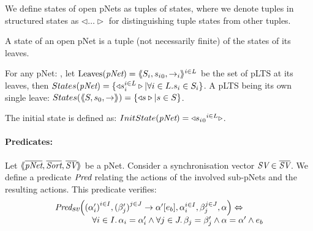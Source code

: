 \documentclass{lncs/llncs}
\begin{document}
%

We define states of open pNets as tuples of states, where we denote tuples
in structured states as $\triangleleft\ldots\triangleright$ for distinguishing tuple 
states from other tuples.
\begin{definition}\label{def-states}
  A state of an open pNet is a tuple (not necessarily finite) of the
  states of its leaves.

  For any pNet: \pNet, let $\Leaves(\pNet) = \mylangle S_i,{s_i}_0, \to_i\myrangle^{i \in L}$ be 
  the set of pLTS at its leaves,
  then $States(\pNet) = \{\triangleleft s_i^{i\in L}
  \triangleright| \forall i\in L. s_i \in S_i\}$.
A pLTS being its own single leave:
  $States(\langle\hspace{-0.58ex}\langle S,s_0, \to\rangle\hspace{-0.58ex}\rangle) = \{\triangleleft s \triangleright| s \in S\}$.

The initial state is defined as:
$InitState(\pNet) = \triangleleft {{s_i}_0}^{i\in L}  \triangleright$.
\end{definition}




\paragraph{Predicates:}
Let
$\mylangle\overline{\pNet},\overline{\Sort},\overline{\symb{SV}}\myrangle$
be a pNet. Consider a synchronisation vector $\symb{SV}\in \overline{\symb{SV}}$. We 
define a
predicate $\Pred$ relating
the actions of the involved sub-pNets and the resulting actions. This predicate verifies:
\[\begin{array}{l}\Pred_{\symb{sv}} \Big(\SV{{(\alpha'_i)}^{i\in I}, {(\beta'_j)}^{j\in J}} 
{\alpha'} 
{e_b}, \alpha_i^{i\in I}, \beta_j^{j\in J}, \alpha\Big)\Leftrightarrow \\~\qquad\qquad%
%
\forall i\in I.\, \alpha_i=\alpha'_i\land \forall j \in J.\, \beta_j=\beta'_j \land 
\alpha=\alpha' 
\land e_b
\end{array} 
\]
\end{document}
